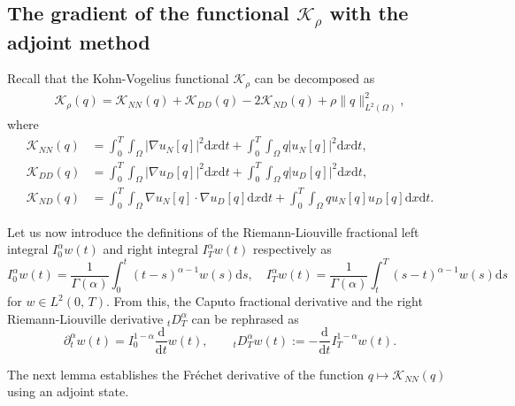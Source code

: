 \documentclass[a4paper,12pt,reqno,natbib]{amsart}
\newcommand{\dx} {\displaystyle\mathrm{d}x}
\newcommand{\dt} {\displaystyle\mathrm{d}t}
\newcommand{\dss} {\displaystyle\mathrm{d}s}
\def\K{\mathcal K}
\begin{document}
{\subsection{The gradient of the functional $\K_\rho$ with the adjoint method}\label{sec:7}
Recall that the Kohn-Vogelius functional $\mathcal{K}_\rho$ can be decomposed as
\begin{align*}
    \mathcal{K}_\rho(q)= \mathcal{K}_{NN}(q) + \mathcal{K}_{DD}(q) -2\mathcal{K}_{ND}(q)+\rho\| q\|^2_{L^2(\Omega)},
\end{align*}
where
\begin{align*}
    \mathcal{K}_{NN}(q)&=\int_0^T\int_\Omega\Big|\nabla u_N[q]\Big|^2\dx\dt +\int_0^T\int_{\Omega}q\Big| u_N[q]\Big|^2 \dx \dt,\\
    \mathcal{K}_{DD}(q)&=\int_0^T\int_\Omega\Big|\nabla u_D[q]\Big|^2\dx\dt +\int_0^T\int_{\Omega}q\Big| u_D[q]\Big|^2 \dx \dt,\\
        \mathcal{K}_{ND}(q)&=\int_0^T\int_{\Omega}\nabla u_N[q] \cdot\nabla u_D[q] \dx \dt
    +\int_0^T\int_{\Omega}q  u_N[q] u_D[q] \dx \dt.
\end{align*}

Let us now introduce the definitions of the Riemann-Liouville fractional left integral $I_{0}^\alpha w(t)$ and right integral $I_{T}^\alpha w(t)$ respectively as
\begin{equation*}
I_{0}^\alpha w(t)=\frac{1}{\Gamma(\alpha)} \int_0^t (t-s)^{\alpha-1}w(s)\dss, \quad
I_{T}^\alpha w(t)=\frac{1}{\Gamma(\alpha)} \int_t^T (s-t)^{\alpha-1}w(s)\dss
\end{equation*}
for $w\in L^2(0,\,T).$ From this, the Caputo fractional derivative and the right Riemann-Liouville derivative ${}_tD^{\alpha}_T$ can be rephrased as 
\begin{equation}\label{operater-adj}
  \partial_t^\alpha w(t)=I_{0}^{1-\alpha} \frac{\mathrm{d}}{\dt}w(t),\qquad  {}_tD^{\alpha}_T w(t):=-\frac{\mathrm{d}}{\dt} I^{1-\alpha}_{T}w(t).
\end{equation} 



The next lemma establishes the Fr\'echet derivative of the function $q\longmapsto\mathcal{K}_{NN}(q)$ using an adjoint state.

}
\end{document}
